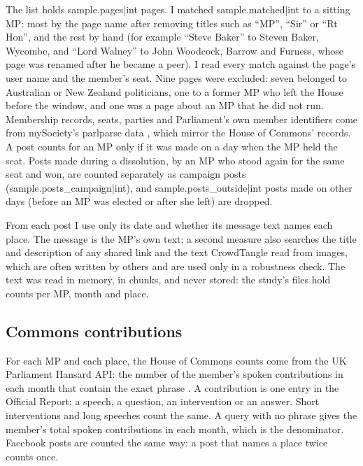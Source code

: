 \documentclass[11pt,a4paper]{article}
\begin{document}
The list holds {{sample.pages|int}} pages. I matched {{sample.matched|int}} to a sitting MP: most by the page name after removing titles such as ``MP'', ``Sir'' or ``Rt Hon'', and the rest by hand (for example ``Steve Baker'' to Steven Baker, Wycombe, and ``Lord Walney'' to John Woodcock, Barrow and Furness, whose page was renamed after he became a peer). I read every match against the page's user name and the member's seat. Nine pages were excluded: seven belonged to Australian or New Zealand politicians, one to a former MP who left the House before the window, and one was a page about an MP that he did not run. Membership records, seats, parties and Parliament's own member identifiers come from mySociety's parlparse data \citep{parlparse2026}, which mirror the House of Commons' records. A post counts for an MP only if it was made on a day when the MP held the seat. Posts made during a dissolution, by an MP who stood again for the same seat and won, are counted separately as campaign posts ({{sample.posts_campaign|int}}), and {{sample.posts_outside|int}} posts made on other days (before an MP was elected or after she left) are dropped.

From each post I use only its date and whether its message text names each place. The message is the MP's own text; a second measure also searches the title and description of any shared link and the text CrowdTangle read from images, which are often written by others and are used only in a robustness check. The text was read in memory, in chunks, and never stored: the study's files hold counts per MP, month and place.

\subsection{Commons contributions}
For each MP and each place, the House of Commons counts come from the UK Parliament Hansard API: the number of the member's spoken contributions in each month that contain the exact phrase \citep{hansard2026}. A contribution is one entry in the Official Report: a speech, a question, an intervention or an answer. Short interventions and long speeches count the same. A query with no phrase gives the member's total spoken contributions in each month, which is the denominator. Facebook posts are counted the same way: a post that names a place twice counts once.
\end{document}
